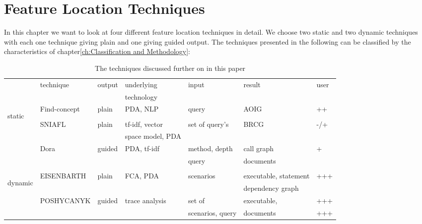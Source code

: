 \chapter{Feature Location Techniques}

In this chapter we want to look at four different feature location techniques in detail. We choose two static and two dynamic techniques with each one technique giving plain and one giving guided output. The techniques presented in the following can be classified by the characteristics of chapter\ref{ch:Classification and Methodology}:

\begin{table}[h]
	\hspace{-3em}
	\begin{tabular}{|l| l l l l l l|}
		\hline
		 & technique &  output & underlying & input & result & user \\ 
		 &  &  &  technology &  &  &  \\\hline
		 \multirow{5}{1em}{\begin{sideways} static \end{sideways}}
		 & Find-concept  & plain & PDA, NLP & query & AOIG & ++ 
		 \\ \\
		 & SNIAFL & plain & tf-idf, vector & set of query's & BRCG & -/+ \\ 
		 &        &       & space model, PDA  &             &      &
		 \\ 
		 & Dora & guided & PDA, tf-idf & method, depth & call graph & + \\ 
		 &      &        &             & query         & documents             &  
		 \\ \\ \hline
		 \multirow{4}{1em}{\begin{sideways} dynamic \end{sideways}}
		 & EISENBARTH  & plain & FCA, PDA & scenarios & executable, statement& +++ \\
		 &   &  &  &  &dependency graph &   \\ 
		 & POSHYCANYK  & guided & trace analysis & set of& executable, & +++\\
		 &   &  &  & scenarios, query & documents & +++\\ \hline
		
	\end{tabular}
	\caption{The techniques discussed further on in this paper}
	\label{tab:techniques overview}
\end{table}

